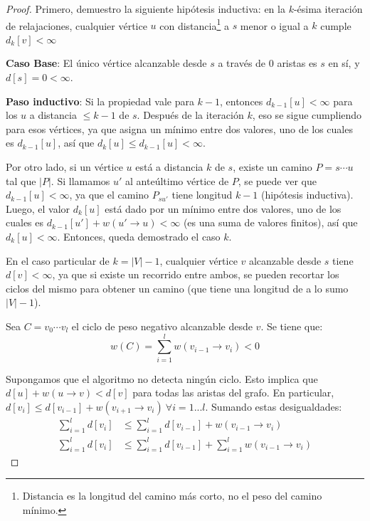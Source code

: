 \documentclass[a4paper]{report}
\begin{document}
\begin{proof}
    Primero, demuestro la siguiente hipótesis inductiva: en la $k$-ésima iteración de relajaciones, cualquier vértice $u$ con distancia\footnote{Distancia es la longitud del camino más corto, no el peso del camino mínimo.} a $s$ menor o igual a $k$ cumple $d_k[v] < \infty$

    \textbf{Caso Base}: El único vértice alcanzable desde $s$ a través de $0$ aristas es $s$ en sí, y $d[s] = 0 < \infty$.

    \textbf{Paso inductivo}: Si la propiedad vale para $k - 1$, entonces $d_{k - 1}[u] < \infty$ para los $u$ a distancia $\leq k - 1$ de $s$. Después de la iteración $k$, eso se sigue cumpliendo para esos vértices, ya que  asigna un mínimo entre dos valores, uno de los cuales es $d_{k - 1}[u]$, así que $d_k[u] \leq d_{k - 1}[u] < \infty$.

    Por otro lado, si un vértice $u$ está a distancia $k$ de $s$, existe un camino $P = s \cdots u$ tal que $|P|$. Si llamamos $u'$ al anteúltimo vértice de $P$, se puede ver que $d_{k - 1}[u] < \infty$, ya que el camino $P_{su'}$ tiene longitud $k - 1$ (hipótesis inductiva). Luego, el valor $d_k[u]$ está dado por un mínimo entre dos valores, uno de los cuales es $d_{k - 1}[u'] + w(u' \rightarrow u) < \infty$ (es una suma de valores finitos), así que $d_k[u] < \infty$. Entonces, queda demostrado el caso $k$.

    En el caso particular de $k = |V| - 1$, cualquier vértice $v$ alcanzable desde $s$ tiene $d[v] < \infty$, ya que si existe un recorrido entre ambos, se pueden recortar los ciclos del mismo para obtener un camino (que tiene una longitud de a lo sumo $|V| - 1$).

    Sea $C = v_0 \cdots v_l$ el ciclo de peso negativo alcanzable desde $v$. Se tiene que:
    $$w(C) = \sum_{i = 1}^l w(v_{i - 1} \rightarrow v_i) < 0$$

    Supongamos que el algoritmo no detecta ningún ciclo. Esto implica que $d[u] + w(u \rightarrow v) < d[v]$ para todas las aristas del grafo. En particular, $d[v_i] \leq d[v_{i - 1}] + w(v_{i + 1} \rightarrow v_i)\ \forall i = 1 ... l$. Sumando estas desigualdades:
    \begin{align*}
        \sum_{i = 1}^l d[v_i] & \leq \sum_{i = 1}^l d[v_{i - 1}] + w(v_{i - 1} \rightarrow v_i) \\
        \sum_{i = 1}^l d[v_i] & \leq \sum_{i = 1}^l d[v_{i - 1}] + \sum_{i = 1}^l w(v_{i - 1} \rightarrow v_i)
    \end{align*}


\end{proof}
\end{document}
